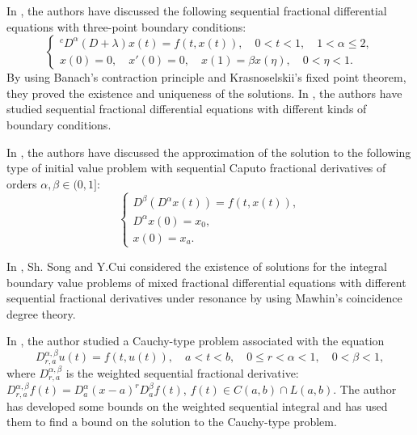 \documentclass{amsart}
\numberwithin{equation}{section}
\begin{document}
In \cite{jumaeva:ref:5}, the authors have discussed the following sequential fractional differential equations with three-point boundary conditions:
\begin{equation*}
\begin{cases}
    {}^c D^\alpha (D + \lambda)x(t) = f(t, x(t)), \quad 0 < t < 1, \quad 1 < \alpha \le 2,\\
    x(0) = 0, \quad x'(0) = 0, \quad x(1) = \beta x(\eta), \quad 0 < \eta < 1.
    \end{cases}
\end{equation*}
By using Banach’s contraction principle and Krasnoselskii’s fixed point theorem, they proved the existence and uniqueness of the solutions. In \cite{jumaeva:ref:6,jumaeva:ref:7}, the authors have studied sequential fractional differential equations with different kinds of boundary conditions.

In \cite{jumaeva:ref:8}, the authors have discussed the approximation of the solution to the following type of initial value problem with sequential
Caputo fractional derivatives of orders $ \alpha,\beta \in (0, 1]$:
\begin{equation*}
    \begin{cases}
        D^\beta(D^\alpha x(t))=f(t,x(t)),\\
        D^\alpha x(0)=x_0,\\
        x(0)=x_a.
    \end{cases}
\end{equation*}

In \cite{jumaeva:ref:9}, Sh. Song and Y.Cui considered the existence of solutions for the integral boundary value problems of mixed fractional differential equations with different sequential fractional derivatives under resonance by using Mawhin’s coincidence degree theory.

In \cite{jumaeva:ref:10}, the author studied a Cauchy-type problem associated with the equation
\begin{equation*}
    D_{r,a}^{\alpha,\beta} u(t)=f(t,u(t)), \quad a<t<b,\quad 0\leq r< \alpha<1, \quad 0<\beta<1,
\end{equation*}
where $D_{r, a}^{\alpha,\beta}$ is the weighted sequential fractional derivative: $D_{r, a}^{\alpha,\beta} f(t) = D_a^\alpha(x-a)^r D_a^\beta f(t)$, $f(t)\in C(a,b)\cap L(a,b).$ The author has developed some bounds on the weighted sequential integral and has used them to find a bound on the solution to the Cauchy-type problem.
\end{document}
